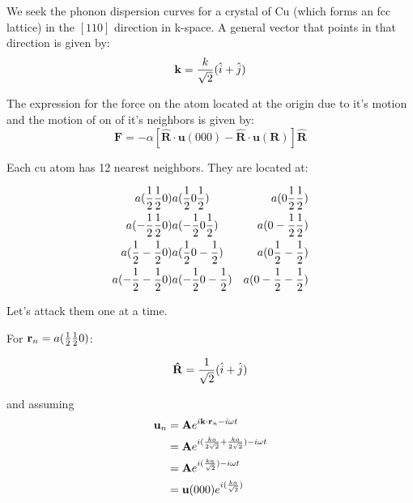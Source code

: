 \documentclass{article}
\begin{document}
\pagestyle{empty}



We seek the phonon dispersion curves for a crystal of Cu (which forms
an fcc lattice) in the $[110]$ direction in k-space.  A general vector
that points in that direction is given by:
\begin{equation}
  \mathbf{k} = {k\over \sqrt{2}} (\hat{i} + \hat{j})
\end{equation}

The expression for the force on the atom located at the origin due to
it's motion and the motion of on of it's neighbors is given by:
\begin{equation}
  \mathbf{F} = - \alpha \left[ \mathbf{\hat{R}}\cdot \mathbf{u}(000) -
  \mathbf{\hat{R}}\cdot \mathbf{u}(\mathbf{R})\right]\mathbf{\hat{R}}
\end{equation}

Each cu atom has 12 nearest neighbors.  They are located at:

\begin{eqnarray}
  a({1\over 2}{1\over 2}0) & a({1\over 2}0{1\over 2}) & a(0{1\over 2}{1\over 2})\\ 
  a(-{1\over 2}{1\over 2}0) & a(-{1\over 2}0{1\over 2}) & a(0-{1\over 2}{1\over 2})\\ 
  a({1\over 2}-{1\over 2}0) & a({1\over 2}0-{1\over 2}) & a(0{1\over 2}-{1\over 2})\\ 
  a(-{1\over 2}-{1\over 2}0) & a(-{1\over 2}0-{1\over 2}) & a(0-{1\over 2}-{1\over 2})\\ 
\end{eqnarray}


Let's attack them one at a time.


For $\mathbf{r}_n = a({1\over
  2}{1\over 2}0)$:

\begin{equation}
  \mathbf{\hat{R}} = {1\over \sqrt{2}} (\hat{i} + \hat{j})
  \end{equation}

and  assuming
\begin{align}
  \mathbf{u}_n &= \mathbf{A}e^{i \mathbf{k} \cdot \mathbf{r}_n - i \omega t}\\
  &= \mathbf{A}e^{i ({k a\over 2 \sqrt{2}} +{k a\over 2 \sqrt{2}} ) - i \omega t}\\
  &= \mathbf{A}e^{i ({k a\over \sqrt{2}} ) - i \omega t}\\
  &= \mathbf{u}(000) e^{i ({k a\over \sqrt{2}} )}\\
  \end{align}
\end{document}
